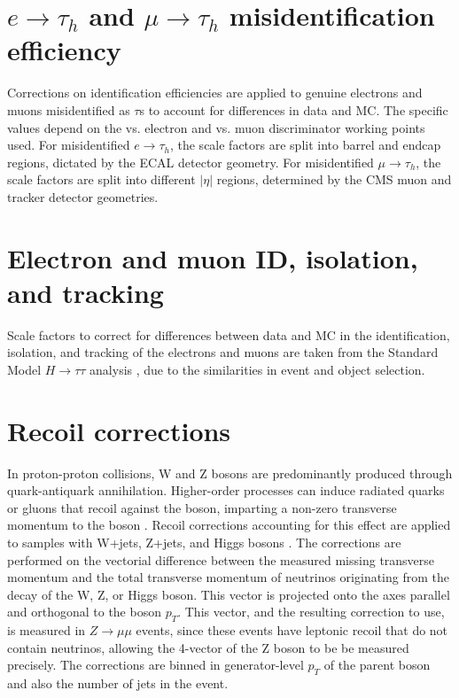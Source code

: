 \section{$e \rightarrow \tau_{h}$ and $\mu \rightarrow \tau_{h}$ misidentification efficiency}
Corrections on identification efficiencies are applied to genuine electrons and muons misidentified as $\tau$s to account for differences in data and MC. The specific values depend on the vs. electron and vs. muon discriminator working points used. For misidentified $e \rightarrow \tau_{h}$, the scale factors are split into barrel and endcap regions, dictated by the ECAL detector geometry. For misidentified $\mu \rightarrow \tau_{h}$, the scale factors are split into different $|\eta|$ regions, determined by the CMS muon and tracker detector geometries.


\section{Electron and muon ID, isolation, and tracking}
Scale factors to correct for differences between data and MC in the identification, isolation, and tracking of the electrons and muons are taken from the Standard Model $H \rightarrow \tau\tau$ analysis \cite{CMS-HIG-19-010}, due to the similarities in event and object selection.

\section{Recoil corrections}
\label{sec:ch-8-recoil-corrections}
In proton-proton collisions, W and Z bosons are predominantly produced through quark-antiquark annihilation. Higher-order processes can induce radiated quarks or gluons that recoil against the boson, imparting a non-zero transverse momentum to the boson \cite{2009-Tevatron-recoil-correction}. Recoil corrections accounting for this effect are applied to samples with W+jets, Z+jets, and Higgs bosons \cite{twiki_HiggsToTauTauWorkingLegacyRun2}. The corrections are performed on the vectorial difference between the measured missing transverse momentum and the total transverse momentum of neutrinos originating from the decay of the W, Z, or Higgs boson. This vector is projected onto the axes parallel and orthogonal to the boson $p_{T}$. This vector, and the resulting correction to use, is measured in $Z \rightarrow \mu\mu$ events, since these events have leptonic recoil that do not contain neutrinos, allowing the 4-vector of the Z boson to be be measured precisely. The corrections are binned in generator-level $p_{T}$ of the parent boson and also the number of jets in the event.

